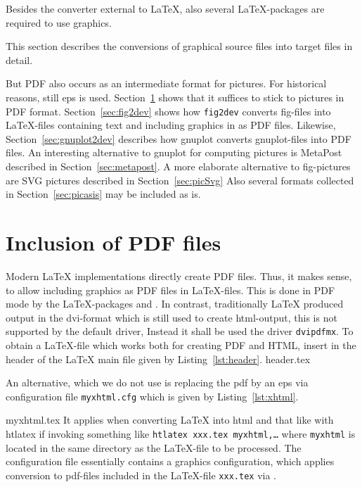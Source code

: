 Besides the converter external to \LaTeX, 
also several \LaTeX-packages are required 
to use graphics. 


This section describes the conversions of 
graphical source files into target files 
in detail. 

But PDF also occurs as an intermediate format for pictures. 
For historical reasons, still \gls{eps} is used. 
Section~\ref{sec:figpdf} shows that it suffices to stick to pictures 
in PDF format. 
Section~\ref{sec:fig2dev} shows how \texttt{fig2dev} converts fig-files 
into \LaTeX-files containing text and including graphics in as PDF files. 
Likewise, Section~\ref{sec:gnuplot2dev} describes 
how gnuplot converts gnuplot-files into PDF files. 
An interesting alternative to gnuplot for computing pictures 
is MetaPost described in Section~\ref{sec:metapost}. 
A more elaborate alternative to fig-pictures are SVG pictures 
described in Section~\ref{sec:picSvg}
Also several formats collected in Section~\ref{sec:picasis} 
may be included as is. 



\section{Inclusion of PDF files}\label{sec:figpdf}

Modern \LaTeX{} implementations directly create PDF files. 
Thus, it makes sense, to allow including graphics as PDF files 
in \LaTeX-files. 
This is done in PDF mode 
by the \LaTeX-packages  and . 
In contrast, traditionally \LaTeX{} produced output in the \gls{dvi}-format 
which is still used to create \gls{html}-output, 
this is not supported by the default driver, 
Instead it shall be used the driver \texttt{dvipdfmx}. 
To obtain a \LaTeX-file which works both for creating PDF and HTML, 
insert in the header of the \LaTeX{} main file
given by Listing~\ref{lst:header}. 
%
%
{header.tex}

An alternative, which we do not use 
is replacing the pdf by an \gls{eps} via configuration file \texttt{myxhtml.cfg} 
which is given by Listing~\ref{lst:xhtml}. 
%

{myxhtml.tex}
%
It applies when converting \LaTeX{} into html and that like 
with htlatex if invoking something like \texttt{htlatex xxx.tex myxhtml,\ldots} 
where \texttt{myxhtml} is located in the same directory as the \LaTeX-file 
to be processed. 
The configuration file essentially contains a graphics configuration, 
which applies conversion to pdf-files included in the \LaTeX-file \texttt{xxx.tex}
via . 


